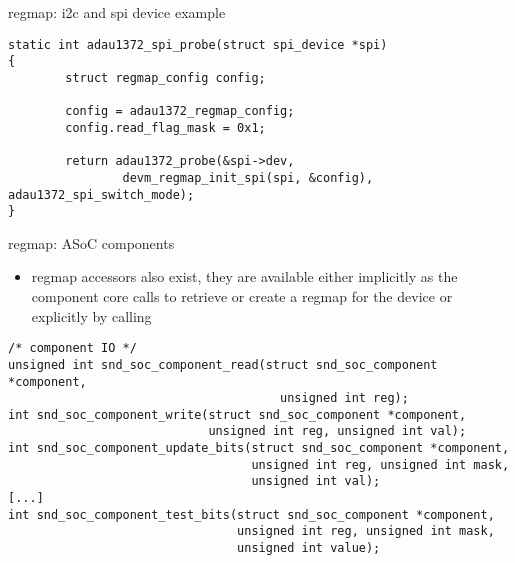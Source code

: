 \begin{frame}[fragile]{regmap: i2c and spi device example}
  \begin{block}{}
  \fontsize{8}{8}\selectfont
    \begin{verbatim}
static int adau1372_spi_probe(struct spi_device *spi)
{
        struct regmap_config config;

        config = adau1372_regmap_config;
        config.read_flag_mask = 0x1;

        return adau1372_probe(&spi->dev,
                devm_regmap_init_spi(spi, &config), adau1372_spi_switch_mode);
}
    \end{verbatim}
  \end{block}
\end{frame}

\begin{frame}[fragile]{regmap: ASoC components}
  \begin{itemize}
  \item {} regmap accessors also exist, they are
    available either implicitly as the component core calls
     to retrieve or create
    a regmap for the device or explicitly by calling
  \end{itemize}
  \begin{block}{}
  \fontsize{9}{9}\selectfont
    \begin{verbatim}
/* component IO */
unsigned int snd_soc_component_read(struct snd_soc_component *component,
                                      unsigned int reg);
int snd_soc_component_write(struct snd_soc_component *component,
                            unsigned int reg, unsigned int val);
int snd_soc_component_update_bits(struct snd_soc_component *component,
                                  unsigned int reg, unsigned int mask,
                                  unsigned int val);
[...]
int snd_soc_component_test_bits(struct snd_soc_component *component,
                                unsigned int reg, unsigned int mask,
                                unsigned int value);
    \end{verbatim}
  \end{block}
\end{frame}
